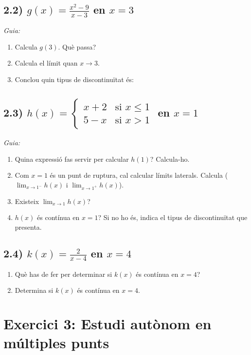 \documentclass[12pt,a4paper]{article}
\begin{document}
\subsection*{2.2) $g(x) = \frac{x^2 - 9}{x - 3}$ \quad en \quad $x=3$}
\textit{Guia:}
\begin{enumerate}
    \item Calcula $g(3)$. Què passa?
    \item Calcula el límit quan $x \to 3$. 
    \item Conclou quin tipus de discontinuïtat és:
\end{enumerate}

\subsection*{2.3) $h(x) = \begin{cases} x + 2 & \text{si } x \le 1 \\ 5 - x & \text{si } x > 1 \end{cases}$ \quad en \quad $x=1$}
\textit{Guia:}
\begin{enumerate}
    \item Quina expressió fas servir per calcular $h(1)$? Calcula-ho.
    \item Com $x=1$ és un punt de ruptura, cal calcular límits laterals. Calcula ($\lim_{x \to 1^-}h(x)$ i $\lim_{x \to 1^+}h(x)$).
    \item Existeix $\lim_{x \to 1} h(x)$? 
    \item $h(x)$ és contínua en $x=1$? Si no ho és, indica el tipus de discontinuïtat que presenta.
    
\end{enumerate}

\subsection*{2.4) $k(x) = \frac{2}{x - 4}$ \quad en \quad $x=4$}
\begin{enumerate}
    \item Què has de fer per determinar si $k(x)$ és contínua en $x=4$?
    \item Determina si $k(x)$ és contínua en $x=4$.
\end{enumerate}

\section*{Exercici 3: Estudi autònom en múltiples punts}
\end{document}
